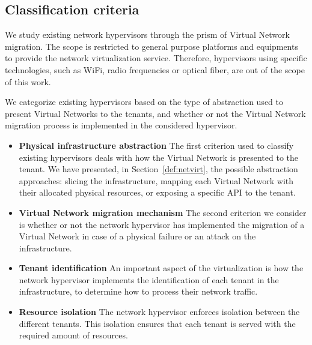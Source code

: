 \subsection{Classification criteria}
We study existing network hypervisors through the prism of Virtual Network migration.
The scope is restricted to general purpose platforms and equipments to provide the network virtualization service. Therefore, hypervisors using specific technologies, such as WiFi, radio frequencies or optical fiber, are out of the scope of this work.

We categorize existing hypervisors based on the type of abstraction used to present Virtual Networks to the tenants, and whether or not the Virtual Network migration process is implemented in the considered hypervisor.

\begin{itemize}
\item \textbf{Physical infrastructure abstraction}
The first criterion used to classify existing hypervisors deals with how the Virtual Network is presented to the tenant. We have presented, in Section~\ref{def:netvirt}, the possible abstraction approaches: slicing the infrastructure, mapping each Virtual Network with their allocated physical resources, or exposing a specific API to the tenant.

\item \textbf{Virtual Network migration mechanism}
The second criterion we consider is whether or not the network hypervisor has implemented the migration of a Virtual Network in case of a physical failure or an attack on the infrastructure.

\item \textbf{Tenant identification}
An important aspect of the virtualization is how the network hypervisor implements the identification of each tenant in the infrastructure, to determine how to process their network traffic.

\item \textbf{Resource isolation}
The network hypervisor enforces isolation between the different tenants.
This isolation ensures that each tenant is served with the required amount of resources.
\end{itemize}
